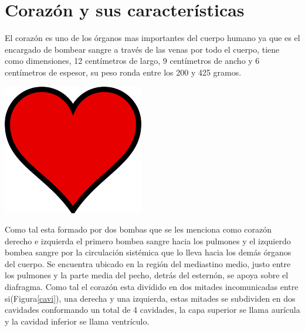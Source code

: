 \chapter{Corazón y sus características}

El corazón es uno de los órganos mas importantes del cuerpo humano ya que es el encargado de bombear sangre a través de las venas por todo el cuerpo, tiene como dimensiones, 12 centímetros de largo, 9 centímetros de ancho y 6 centímetros de espesor, su peso ronda entre los 200 y 425 gramos.\newline

\begin{floatingfigure}[r]{3cm}
\includegraphics{imag/corazon.PNG}
\end{floatingfigure}

Como tal esta formado por dos bombas que se les menciona como corazón derecho e izquierda el primero bombea sangre hacia los pulmones y el izquierdo bombea sangre por la circulación sistémica que lo lleva hacia los demás órganos del cuerpo.\newline
Se encuentra ubicado en la región del mediastino medio, justo entre los pulmones y la parte media del pecho, detrás del esternón, se apoya sobre el diafragma.\newline\newline
Como tal el corazón esta dividido en dos mitades incomunicadas entre si(Figura\ref{cavi}), una derecha y una izquierda, estas mitades se subdividen en dos cavidades conformando un total de 4 cavidades, la capa superior se llama aurícula y la cavidad inferior se llama ventrículo.\newline

